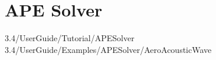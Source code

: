 \section{APE Solver}

3.4/UserGuide/Tutorial/APESolver
3.4/UserGuide/Examples/APESolver/AeroAcousticWave
